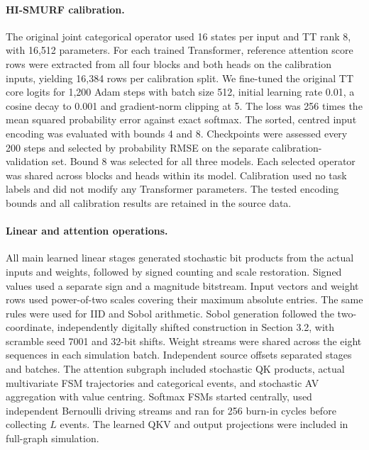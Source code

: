 \paragraph{HI-SMURF calibration.}
The original joint categorical operator used 16 states per input and TT rank
8, with 16,512 parameters. For each trained Transformer, reference attention
score rows were extracted from all four blocks and both heads on the
calibration inputs, yielding 16,384 rows per calibration split. We fine-tuned
the original TT core logits for 1,200 Adam steps with batch size 512, initial
learning rate 0.01, a cosine decay to 0.001 and gradient-norm clipping at 5.
The loss was 256 times the mean squared probability error against exact
softmax. The sorted, centred input encoding was evaluated with bounds 4 and
8. Checkpoints were assessed every 200 steps and selected by probability RMSE
on the separate calibration-validation set. Bound 8 was selected for all
three models. Each selected operator was shared across blocks and heads
within its model. Calibration used no task labels and did not modify any
Transformer parameters. The tested encoding bounds and all calibration
results are retained in the source data.

\paragraph{Linear and attention operations.}
All main learned linear stages generated stochastic bit products from the
actual inputs and weights, followed by signed counting and scale restoration.
Signed values used a separate sign and a magnitude bitstream. Input vectors
and weight rows used power-of-two scales covering their maximum absolute
entries. The same rules were used for IID and Sobol arithmetic. Sobol
generation followed the two-coordinate, independently digitally shifted
construction in Section 3.2, with scramble seed 7001 and 32-bit shifts.
Weight streams were shared across the eight sequences in each simulation
batch. Independent source offsets separated stages and batches.
The attention subgraph included stochastic QK products, actual multivariate
FSM trajectories and categorical events, and stochastic AV aggregation with
value centring. Softmax FSMs started centrally, used independent Bernoulli
driving streams and ran for 256 burn-in cycles before collecting $L$ events.
The learned QKV and output projections were included in full-graph simulation.


